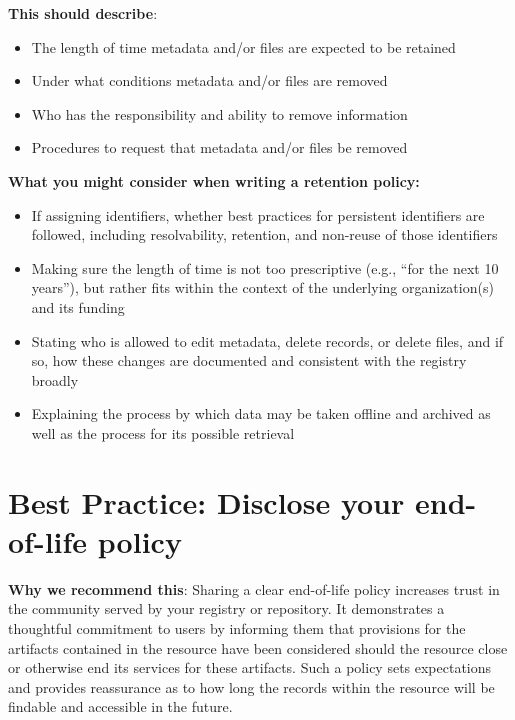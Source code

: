 \documentclass[11pt]{article}
\begin{document}
\textbf{This should describe}:

\begin{itemize}
\item The length of time metadata and/or files are expected to be retained

\item Under what conditions metadata and/or files are removed

\item Who has the responsibility and ability to remove information

\item Procedures to request that metadata and/or files be removed

\end{itemize}

\textbf{What you might consider when writing a retention policy:}

\begin{itemize}
\item If assigning identifiers, whether best practices for persistent identifiers are followed, including resolvability, retention, and non-reuse of those identifiers

\item Making sure the length of time is not too prescriptive (e.g., ``for the next 10 years''), but rather fits within the context of the underlying organization(s) and its funding

\item Stating who is allowed to edit metadata, delete records, or delete files, and if so, how these changes are documented and consistent with the registry broadly

\item Explaining the process by which data may be taken offline and archived as well as the process for its possible retrieval

\end{itemize}


\section{Best Practice: Disclose your end-of-life policy}
\label{best-practice-disclose-your-end-of-life-policy}

\textbf{Why we recommend this}: Sharing a clear end-of-life policy increases trust in the community served by your registry or repository.  It demonstrates a thoughtful commitment to users by informing them that provisions for the artifacts contained in the resource have been considered should the resource close or otherwise end its services for these artifacts. Such a policy sets expectations and provides reassurance as to how long the records within the resource will be findable and accessible in the future.
\end{document}
